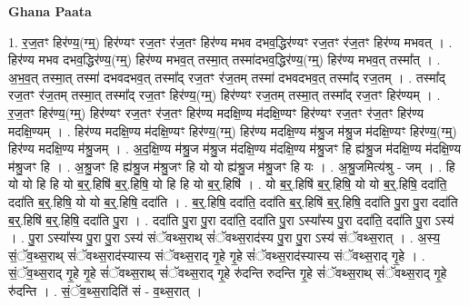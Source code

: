 \documentclass[17pt]{extarticle}
\begin{document}
\textbf{Ghana Paata } \newline

1. र॒ज॒तꣳ हिर॑ण्य॒(ग्म्॒) हिर॑ण्यꣳ रज॒तꣳ र॑ज॒तꣳ हिर॑ण्य मभव दभव॒द्धिर॑ण्यꣳ रज॒तꣳ र॑ज॒तꣳ हिर॑ण्य मभवत् । . हिर॑ण्य मभव दभव॒द्धिर॑ण्य॒(ग्म्॒) हिर॑ण्य मभव॒त् तस्मा॒त् तस्मा॑दभव॒द्धिर॑ण्य॒(ग्म्॒) हिर॑ण्य मभव॒त् तस्मा᳚त् । . अ॒भ॒व॒त् तस्मा॒त् तस्मा॑ दभवदभव॒त् तस्मा᳚द् रज॒तꣳ र॑ज॒तम् तस्मा॑ दभवदभव॒त् तस्मा᳚द् रज॒तम् । . तस्मा᳚द् रज॒तꣳ र॑ज॒तम् तस्मा॒त् तस्मा᳚द् रज॒तꣳ हिर॑ण्य॒(ग्म्॒) हिर॑ण्यꣳ रज॒तम् तस्मा॒त् तस्मा᳚द् रज॒तꣳ हिर॑ण्यम् । . र॒ज॒तꣳ हिर॑ण्य॒(ग्म्॒) हिर॑ण्यꣳ रज॒तꣳ र॑ज॒तꣳ हिर॑ण्य मदक्षि॒ण्य म॑दक्षि॒ण्यꣳ हिर॑ण्यꣳ रज॒तꣳ र॑ज॒तꣳ हिर॑ण्य मदक्षि॒ण्यम् । . हिर॑ण्य मदक्षि॒ण्य म॑दक्षि॒ण्यꣳ हिर॑ण्य॒(ग्म्॒) हिर॑ण्य मदक्षि॒ण्य म॑श्रु॒ज म॑श्रु॒ज म॑दक्षि॒ण्यꣳ हिर॑ण्य॒(ग्म्॒) हिर॑ण्य मदक्षि॒ण्य म॑श्रु॒जम् । . अ॒द॒क्षि॒ण्य म॑श्रु॒ज म॑श्रु॒ज म॑दक्षि॒ण्य म॑दक्षि॒ण्य म॑श्रु॒जꣳ हि ह्य॑श्रु॒ज म॑दक्षि॒ण्य म॑दक्षि॒ण्य म॑श्रु॒जꣳ हि । . अ॒श्रु॒जꣳ हि ह्य॑श्रु॒ज म॑श्रु॒जꣳ हि यो यो ह्य॑श्रु॒ज म॑श्रु॒जꣳ हि यः । . अ॒श्रु॒जमित्य॑श्रु - जम् । . हि यो यो हि हि यो ब॒र्॒.हिषि॑ ब॒र्॒.हिषि॒ यो हि हि यो ब॒र्॒.हिषि॑ । . यो ब॒र्॒.हिषि॑ ब॒र्॒.हिषि॒ यो यो ब॒र्॒.हिषि॒ ददा॑ति॒ ददा॑ति ब॒र्॒.हिषि॒ यो यो ब॒र्॒.हिषि॒ ददा॑ति । . ब॒र्॒.हिषि॒ ददा॑ति॒ ददा॑ति ब॒र्॒.हिषि॑ ब॒र्॒.हिषि॒ ददा॑ति पु॒रा पु॒रा ददा॑ति ब॒र्॒.हिषि॑ ब॒र्॒.हिषि॒ ददा॑ति पु॒रा । . ददा॑ति पु॒रा पु॒रा ददा॑ति॒ ददा॑ति पु॒रा ऽस्या᳚स्य पु॒रा ददा॑ति॒ ददा॑ति पु॒रा ऽस्य॑ । . पु॒रा ऽस्या᳚स्य पु॒रा पु॒रा ऽस्य॑ संॅवथ्स॒राथ् सं॑ॅवथ्स॒राद॑स्य पु॒रा पु॒रा ऽस्य॑ संॅवथ्स॒रात् । . अ॒स्य॒ सं॒ॅव॒थ्स॒राथ् सं॑ॅवथ्स॒राद॑स्यास्य संॅवथ्स॒राद् गृ॒हे गृ॒हे सं॑ॅवथ्स॒राद॑स्यास्य संॅवथ्स॒राद् गृ॒हे । . सं॒ॅव॒थ्स॒राद् गृ॒हे गृ॒हे सं॑ॅवथ्स॒राथ् सं॑ॅवथ्स॒राद् गृ॒हे रु॑दन्ति रुदन्ति गृ॒हे सं॑ॅवथ्स॒राथ् सं॑ॅवथ्स॒राद् गृ॒हे रु॑दन्ति । . सं॒ॅव॒थ्स॒रादिति॑ सं - व॒थ्स॒रात् । \newline
\end{document}
